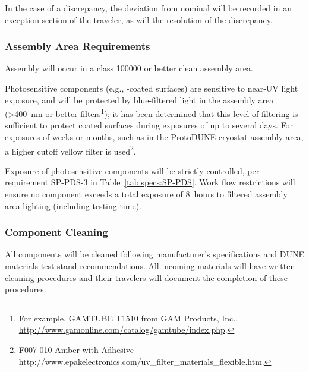 In the case of a discrepancy, the deviation from nominal will be recorded in an exception section of the traveler, as will the resolution of the discrepancy.

\subsubsection{Assembly Area Requirements}

Assembly will occur in a class \num{100000} or better clean assembly area.  

%

Photosensitive components (e.g., -coated surfaces) are sensitive to near-UV light exposure, and will be protected by blue-filtered light in the assembly area (>\SI{400}{nm} or better filters\footnote{For example, GAMTUBE T1510\texttrademark{} from GAM Products, Inc., \url{http://www.gamonline.com/catalog/gamtube/index.php}.}); it has been determined that this level of filtering is sufficient to protect coated surfaces during  exposures of up to several days. For exposures of weeks or months, such as in the ProtoDUNE cryostat assembly area, a higher cutoff yellow filter is used\footnote{F007-010\texttrademark{} Amber with Adhesive - http://www.epakelectronics.com/uv\_filter\_materials\_flexible.htm.}. 


Exposure of photosensitive components will be strictly controlled, per requirement SP-PDS-3 in Table~\ref{tab:specs:SP-PDS}.  
Work flow restrictions will %
ensure no component exceeds a total exposure of \SI{8}{hours} to filtered assembly area lighting (including testing time).

\subsubsection{Component Cleaning}
\label{sssec:cleaning}
All components will be cleaned %
following manufacturer's specifications and DUNE materials test stand recommendations.  %
All incoming materials will have written cleaning procedures and their travelers will document the completion of these procedures.


